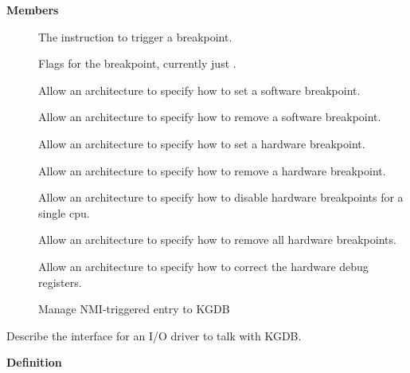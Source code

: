 \documentclass[a4paper,8pt,english]{sphinxmanual}
\begin{document}
\textbf{Members}
\begin{description}
\item[{}] \leavevmode
The instruction to trigger a breakpoint.

\item[{}] \leavevmode
Flags for the breakpoint, currently just .

\item[{}] \leavevmode
Allow an architecture to specify how to set a software
breakpoint.

\item[{}] \leavevmode
Allow an architecture to specify how to remove a
software breakpoint.

\item[{}] \leavevmode
Allow an architecture to specify how to set a hardware
breakpoint.

\item[{}] \leavevmode
Allow an architecture to specify how to remove a
hardware breakpoint.

\item[{}] \leavevmode
Allow an architecture to specify how to disable
hardware breakpoints for a single cpu.

\item[{}] \leavevmode
Allow an architecture to specify how to remove all
hardware breakpoints.

\item[{}] \leavevmode
Allow an architecture to specify how to correct the
hardware debug registers.

\item[{}] \leavevmode
Manage NMI-triggered entry to KGDB

\end{description}

\begin{fulllineitems}
\label{dev-tools/kgdb:c.kgdb_io}
Describe the interface for an I/O driver to talk with KGDB.

\end{fulllineitems}


\textbf{Definition}
\end{document}
